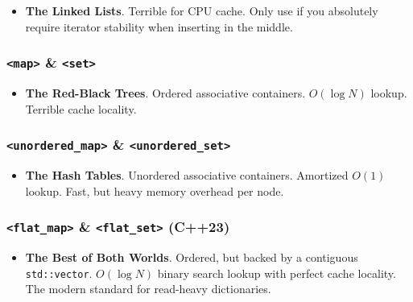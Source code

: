 \begin{itemize}
\tightlist
\item
  \textbf{The Linked Lists}. Terrible for CPU cache. Only use if you
  absolutely require iterator stability when inserting in the middle.
\end{itemize}

\hypertarget{map-set}{%
\subsubsection{\texorpdfstring{\texttt{\textless{}map\textgreater{}} \&
\texttt{\textless{}set\textgreater{}}}{\textless map\textgreater{} \& \textless set\textgreater{}}}\label{map-set}}

\begin{itemize}
\tightlist
\item
  \textbf{The Red-Black Trees}. Ordered associative containers.
  \(O(\log N)\) lookup. Terrible cache locality.
\end{itemize}

\hypertarget{unordered_map-unordered_set}{%
\subsubsection{\texorpdfstring{\texttt{\textless{}unordered\_map\textgreater{}}
\&
\texttt{\textless{}unordered\_set\textgreater{}}}{\textless unordered\_map\textgreater{} \& \textless unordered\_set\textgreater{}}}\label{unordered_map-unordered_set}}

\begin{itemize}
\tightlist
\item
  \textbf{The Hash Tables}. Unordered associative containers. Amortized
  \(O(1)\) lookup. Fast, but heavy memory overhead per node.
\end{itemize}

\hypertarget{flat_map-flat_set-c23}{%
\subsubsection{\texorpdfstring{\texttt{\textless{}flat\_map\textgreater{}}
\& \texttt{\textless{}flat\_set\textgreater{}}
(C++23)}{\textless flat\_map\textgreater{} \& \textless flat\_set\textgreater{} (C++23)}}\label{flat_map-flat_set-c23}}

\begin{itemize}
\tightlist
\item
  \textbf{The Best of Both Worlds}. Ordered, but backed by a contiguous
  \passthrough{\lstinline!std::vector!}. \(O(\log N)\) binary search
  lookup with perfect cache locality. The modern standard for read-heavy
  dictionaries.
\end{itemize}

